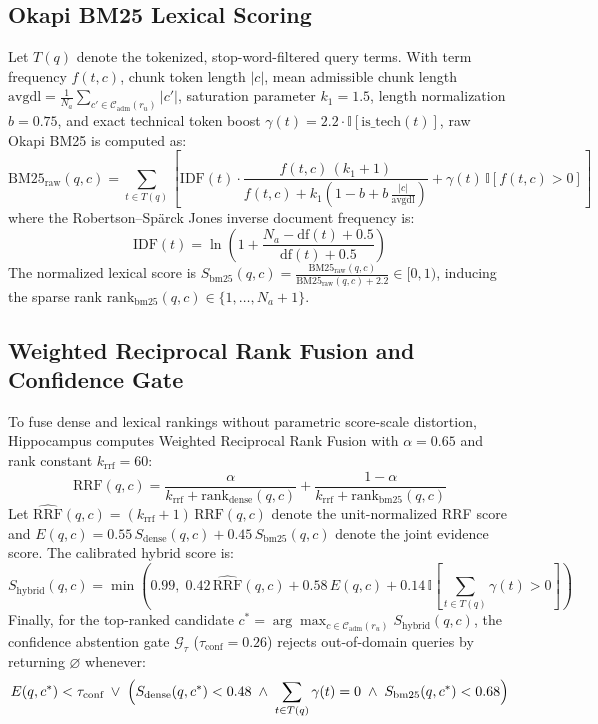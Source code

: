 \documentclass[conference]{IEEEtran}
\begin{document}
\subsection{Okapi BM25 Lexical Scoring}
Let $T(q)$ denote the tokenized, stop-word-filtered query terms. With term frequency $f(t, c)$, chunk token length $|c|$, mean admissible chunk length $\text{avgdl} = \frac{1}{N_a}\sum_{c' \in \mathcal{C}_{\text{adm}}(r_u)} |c'|$, saturation parameter $k_1 = 1.5$, length normalization $b = 0.75$, and exact technical token boost $\gamma(t) = 2.2 \cdot \mathbb{I}[\text{is\_tech}(t)]$, raw Okapi BM25 is computed as:
\begin{equation}
\text{BM25}_{\text{raw}}(q, c) = \sum_{t \in T(q)} \left[ \text{IDF}(t) \cdot \frac{f(t, c)\,(k_1 + 1)}{f(t, c) + k_1\!\left(1 - b + b\,\frac{|c|}{\text{avgdl}}\right)} + \gamma(t)\,\mathbb{I}[f(t, c) > 0] \right]
\label{eq:bm25}
\end{equation}
where the Robertson--Sp\"arck Jones inverse document frequency is:
\begin{equation}
\text{IDF}(t) = \ln\!\left(1 + \frac{N_a - \text{df}(t) + 0.5}{\text{df}(t) + 0.5}\right)
\end{equation}
The normalized lexical score is $S_{\text{bm25}}(q, c) = \frac{\text{BM25}_{\text{raw}}(q, c)}{\text{BM25}_{\text{raw}}(q, c) + 2.2} \in [0, 1)$, inducing the sparse rank $\text{rank}_{\text{bm25}}(q, c) \in \{1, \dots, N_a + 1\}$.

\subsection{Weighted Reciprocal Rank Fusion and Confidence Gate}
To fuse dense and lexical rankings without parametric score-scale distortion, Hippocampus computes Weighted Reciprocal Rank Fusion with $\alpha = 0.65$ and rank constant $k_{\text{rrf}} = 60$:
\begin{equation}
\text{RRF}(q, c) = \frac{\alpha}{k_{\text{rrf}} + \text{rank}_{\text{dense}}(q, c)} + \frac{1 - \alpha}{k_{\text{rrf}} + \text{rank}_{\text{bm25}}(q, c)}
\label{eq:rrf}
\end{equation}
Let $\widehat{\text{RRF}}(q, c) = (k_{\text{rrf}} + 1)\,\text{RRF}(q, c)$ denote the unit-normalized RRF score and $E(q, c) = 0.55\,S_{\text{dense}}(q, c) + 0.45\,S_{\text{bm25}}(q, c)$ denote the joint evidence score. The calibrated hybrid score is:
\begin{equation}
S_{\text{hybrid}}(q, c) = \min\!\left(0.99,\; 0.42\,\widehat{\text{RRF}}(q, c) + 0.58\,E(q, c) + 0.14\,\mathbb{I}\!\left[\sum_{t \in T(q)} \gamma(t) > 0\right]\right)
\end{equation}
Finally, for the top-ranked candidate $c^* = \arg\max_{c \in \mathcal{C}_{\text{adm}}(r_u)} S_{\text{hybrid}}(q, c)$, the confidence abstention gate $\mathcal{G}_{\tau}$ ($\tau_{\text{conf}} = 0.26$) rejects out-of-domain queries by returning $\varnothing$ whenever:
\begin{equation}
E(q, c^*) < \tau_{\text{conf}} \;\lor\; \Bigl(S_{\text{dense}}(q, c^*) < 0.48 \;\land\; \sum_{t \in T(q)}\gamma(t) = 0 \;\land\; S_{\text{bm25}}(q, c^*) < 0.68\Bigr)
\label{eq:gate}
\end{equation}
\end{document}
